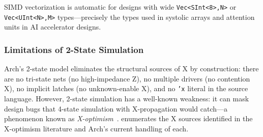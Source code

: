\documentclass[manuscript]{acmart}
\begin{document}
SIMD vectorization is automatic for designs with wide \texttt{Vec<SInt<8>,N>} or \texttt{Vec<UInt<N>,M>} types---precisely the types used in systolic arrays and attention units in AI accelerator designs.

\subsubsection{Limitations of 2-State Simulation}

Arch's 2-state model eliminates the structural sources of X by construction: there are no tri-state nets (no high-impedance Z), no multiple drivers (no contention X), no implicit latches (no unknown-enable X), and no \texttt{'x} literal in the source language. However, 2-state simulation has a well-known weakness: it can mask design bugs that 4-state simulation with X-propagation would catch---a phenomenon known as \emph{X-optimism}~\cite{zhao2014xoptimism}.  enumerates the X sources identified in the X-optimism literature and Arch's current handling of each.
\end{document}
